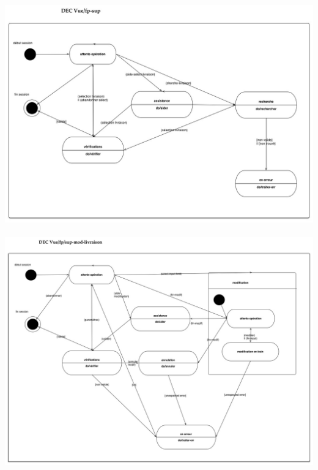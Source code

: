 \documentclass{report}
\begin{document}
~~\\
~~\\
\includegraphics[scale = 0.5, angle = 90]{images/dec-superviseur-principale.jpg}

\paragraph{}

\includegraphics[scale = 0.5, angle = 90]{images/dec-superviseur-modif.jpg}
\end{document}
